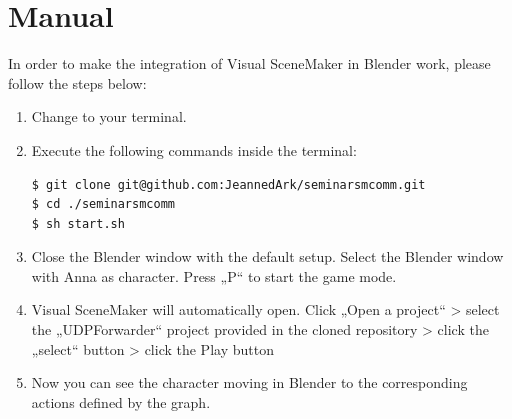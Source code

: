 \documentclass[
10pt, %
a4paper, %
oneside,
headinclude,footinclude, %
BCOR 0mm, %
]{scrartcl}
\begin{document}
\section{Manual}
In order to make the integration of Visual SceneMaker in Blender work, please follow the steps below:
\begin{enumerate}[noitemsep] %
\item Change to your terminal.
\item Execute the following commands inside the terminal:
\begin{lstlisting}
$ git clone git@github.com:JeannedArk/seminarsmcomm.git
$ cd ./seminarsmcomm
$ sh start.sh
\end{lstlisting}
\item Close the Blender window with the default setup. Select the Blender window with Anna as character. Press „P“ to start the game mode.
\item Visual SceneMaker will automatically open. Click „Open a project“ > select the „UDPForwarder“ project provided in the cloned repository > click the „select“ button > click the Play button
\item Now you can see the character moving in Blender to the corresponding actions defined by the graph.
\end{enumerate}
\end{document}
